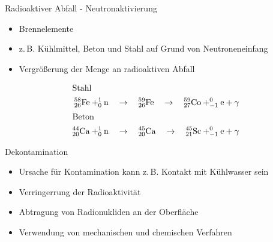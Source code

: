 \begin{frame}{Radioaktiver Abfall - Neutronaktivierung}

      \begin{itemize}
        \setlength\itemsep{1.2em}
        \item{Brennelemente}
        \item{z.\,B. Kühlmittel, Beton und Stahl auf Grund von Neutroneneinfang}
        \item{ Vergrößerung der Menge an radioaktiven Abfall}
      \end{itemize}

    \begin{align*}
        \shortintertext{Stahl}
        ^{58}_{26}\ce{Fe}+ ^1_0\mathrm{n }\quad &\rightarrow \quad  ^{59}_{26}\ce{Fe} \quad \rightarrow \quad ^{59}_{27}\ce{Co} + _{-1}^{0}\ce{e}+\gamma \\
      \shortintertext{Beton}
          ^{44}_{20}\ce{Ca}+ ^1_0\mathrm{n }\quad &\rightarrow \quad  ^{45}_{20}\ce{Ca} \quad \rightarrow \quad ^{45}_{21}\ce{Sc} + _{-1}^{0}\ce{e}+\gamma
    \end{align*}

\end{frame}



\begin{frame}{Dekontamination}
  \begin{itemize}
    \setlength\itemsep{1.2em}
     \item{ Ursache für Kontamination kann z.\,B. Kontakt mit Kühlwasser sein}
    \item{ Verringerrung der Radioaktivität}
    \item{ Abtragung von Radionukliden an der Oberfläche}
    \item{ Verwendung von mechanischen und chemischen Verfahren}
  \end{itemize}
\end{frame}


